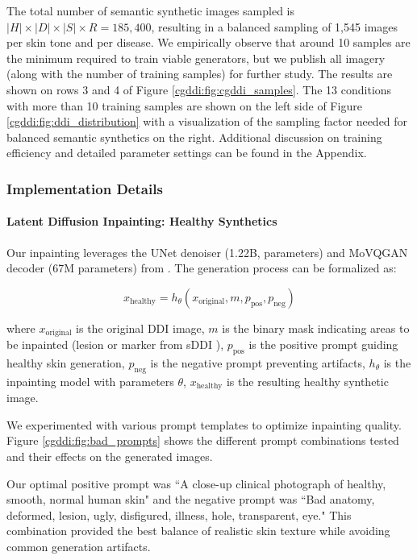 \documentclass[11pt]{ucthesis}
\begin{document}
The total number of semantic synthetic images sampled is $|H|\times|D|\times|S|\times R = 185,400$, resulting in a balanced sampling of 1,545 images per skin tone and per disease. We empirically observe that around 10 samples are the minimum required to train viable generators, but we publish all imagery (along with the number of training samples) for further study. The results are shown on rows 3 and 4 of Figure  \ref{cgddi:fig:cgddi_samples}. The 13 conditions with more than 10 training samples are shown on the left side of Figure \ref{cgddi:fig:ddi_distribution} with a visualization of the sampling factor needed for balanced semantic synthetics on the right. Additional discussion on training efficiency and detailed parameter settings can be found in the Appendix.


\subsubsection{Implementation Details}

\paragraph{Latent Diffusion Inpainting: Healthy Synthetics}
Our inpainting leverages the UNet denoiser (1.22B, parameters) and MoVQGAN decoder (67M parameters) from \cite{razzhigaev-2023}. The generation process can be formalized as:

\begin{equation}
x_{\text{healthy}} = h_{\theta}(x_{\text{original}}, m, p_{\text{pos}}, p_{\text{neg}})
\end{equation}

where $x_{\text{original}}$ is the original DDI image, $m$ is the binary mask indicating areas to be inpainted (lesion or marker from sDDI \cite{carrion-2023}), $p_{\text{pos}}$ is the positive prompt guiding healthy skin generation, $p_{\text{neg}}$ is the negative prompt preventing artifacts, $h_{\theta}$ is the inpainting model with parameters $\theta$, $x_{\text{healthy}}$ is the resulting healthy synthetic image.

We experimented with various prompt templates to optimize inpainting quality. Figure \ref{cgddi:fig:bad_prompts} shows the different prompt combinations tested and their effects on the generated images.

Our optimal positive prompt was ``A close-up clinical photograph of healthy, smooth, normal human skin" and the negative prompt was ``Bad anatomy, deformed, lesion, ugly, disfigured, illness, hole, transparent, eye." This combination provided the best balance of realistic skin texture while avoiding common generation artifacts.
\end{document}
